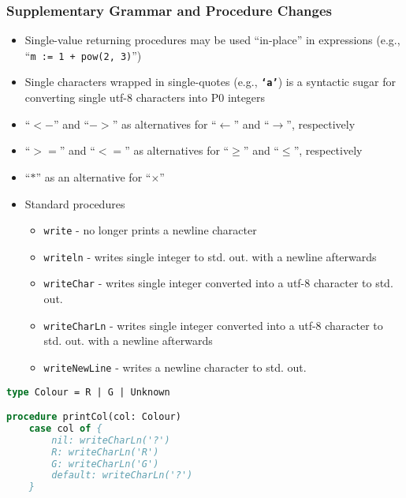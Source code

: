 \documentclass{beamer}
\begin{document}
\begin{frame}
\frametitle{Supplementary Grammar and Procedure Changes}

\begin{itemize}
 \item<1-> Single-value returning procedures may be used ``in-place'' in expressions (e.g., ``\texttt{m := 1 + pow(2, 3)}'')
 \item<2-> Single characters wrapped in single-quotes (e.g., \textbf{\texttt{`a'}}) is a syntactic sugar for converting single utf-8 characters into P0 integers
 \item<3-> ``$<-$'' and ``$->$'' as alternatives for ``$\leftarrow$'' and ``$\rightarrow$'', respectively
 \item<4-> ``$>=$'' and ``$<=$'' as alternatives for ``$\geq$'' and ``$\leq$'', respectively
 \item<5-> ``$*$'' as an alternative for ``$\times$''
 \item<6-> Standard procedures
 \begin{itemize}
  \item \texttt{write} - no longer prints a newline character
  \item \texttt{writeln} - writes single integer to std. out. with a newline afterwards
  \item \texttt{writeChar} - writes single integer converted into a utf-8 character to std. out.
  \item \texttt{writeCharLn} - writes single integer converted into a utf-8 character to std. out. with a newline afterwards
  \item \texttt{writeNewLine} - writes a newline character to std. out.
 \end{itemize}
\end{itemize}

\end{frame}


\begin{lrbox}{\caseGenCode}
\begin{lstlisting}[language=Pascal,basicstyle=\tiny]
type Colour = R | G | Unknown

procedure printCol(col: Colour)
    case col of {
        nil: writeCharLn('?')
        R: writeCharLn('R')
        G: writeCharLn('G')
        default: writeCharLn('?')
    }

\end{lstlisting}
\end{lrbox}
\end{document}
